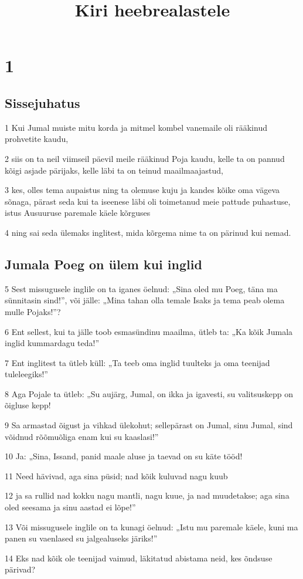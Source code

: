 

\title{Kiri heebrealastele}

\chapter{1}

\section*{Sissejuhatus}

\par 1 Kui Jumal muiste mitu korda ja mitmel kombel vanemaile oli rääkinud prohvetite kaudu,
\par 2 siis on ta neil viimseil päevil meile rääkinud Poja kaudu, kelle ta on pannud kõigi asjade pärijaks, kelle läbi ta on teinud maailmaajastud,
\par 3 kes, olles tema aupaistus ning ta olemuse kuju ja kandes kõike oma vägeva sõnaga, pärast seda kui ta iseenese läbi oli toimetanud meie pattude puhastuse, istus Ausuuruse paremale käele kõrguses
\par 4 ning sai seda ülemaks inglitest, mida kõrgema nime ta on pärinud kui nemad.

\section*{Jumala Poeg on ülem kui inglid}

\par 5 Sest missugusele inglile on ta iganes öelnud: „Sina oled mu Poeg, täna ma sünnitasin sind!”, või jälle: „Mina tahan olla temale Isaks ja tema peab olema mulle Pojaks!”?
\par 6 Ent sellest, kui ta jälle toob esmasündinu maailma, ütleb ta: „Ka kõik Jumala inglid kummardagu teda!”
\par 7 Ent inglitest ta ütleb küll: „Ta teeb oma inglid tuulteks ja oma teenijad tuleleegiks!”
\par 8 Aga Pojale ta ütleb: „Su aujärg, Jumal, on ikka ja igavesti, su valitsuskepp on õigluse kepp!
\par 9 Sa armastad õigust ja vihkad ülekohut; sellepärast on Jumal, sinu Jumal, sind võidnud rõõmuõliga enam kui su kaaslasi!”
\par 10 Ja: „Sina, Issand, panid maale aluse ja taevad on su käte tööd!
\par 11 Need hävivad, aga sina püsid; nad kõik kuluvad nagu kuub
\par 12 ja sa rullid nad kokku nagu mantli, nagu kuue, ja nad muudetakse; aga sina oled seesama ja sinu aastad ei lõpe!”
\par 13 Või missugusele inglile on ta kunagi öelnud: „Istu mu paremale käele, kuni ma panen su vaenlased su jalgealuseks järiks!”
\par 14 Eks nad kõik ole teenijad vaimud, läkitatud abistama neid, kes õndsuse pärivad?


